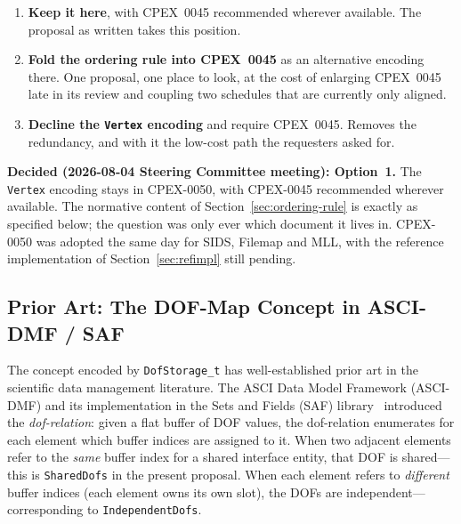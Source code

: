 \documentclass[11pt,letterpaper]{article}
\begin{document}
\begin{enumerate}[leftmargin=2em]
\item \textbf{Keep it here}, with CPEX~0045 recommended wherever
  available.  The proposal as written takes this position.
\item \textbf{Fold the ordering rule into CPEX~0045} as an alternative
  encoding there.  One proposal, one place to look, at the cost of
  enlarging CPEX~0045 late in its review and coupling two schedules that
  are currently only aligned.
\item \textbf{Decline the \texttt{Vertex} encoding} and require
  CPEX~0045.  Removes the redundancy, and with it the low-cost path the
  requesters asked for.
\end{enumerate}

\textbf{Decided (2026-08-04 Steering Committee meeting): Option~1.} The
\texttt{Vertex} encoding stays in CPEX-0050, with CPEX-0045 recommended
wherever available. The normative content of
Section~\ref{sec:ordering-rule} is exactly as specified below; the
question was only ever which document it lives in. CPEX-0050 was
adopted the same day for SIDS, Filemap and MLL, with the reference
implementation of Section~\ref{sec:refimpl} still pending.

\subsection{Prior Art: The DOF-Map Concept in ASCI-DMF / SAF}
\label{sec:prior-art}

The concept encoded by \texttt{DofStorage\_t} has well-established prior art in the
scientific data management literature.  The ASCI Data Model Framework (ASCI-DMF) and
its implementation in the Sets and Fields (SAF) library~\cite{miller2003} introduced the
\emph{dof-relation}: given a flat buffer of DOF values, the dof-relation enumerates for
each element which buffer indices are assigned to it.  When two adjacent elements refer to
the \emph{same} buffer index for a shared interface entity, that DOF is shared---this is
\texttt{SharedDofs} in the present proposal.  When each element refers to
\emph{different} buffer indices (each element owns its own slot), the DOFs are
independent---corresponding to \texttt{IndependentDofs}.
\end{document}
